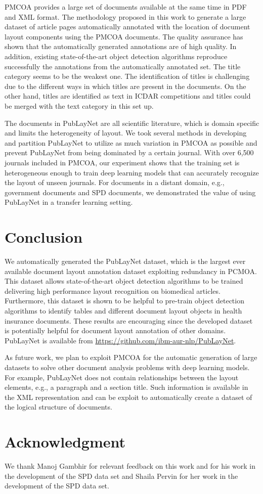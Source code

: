 \documentclass[conference]{IEEEtran}
\begin{document}
PMCOA provides a large set of documents available at the same time in PDF and XML format.
The methodology proposed in this work to generate a large dataset of article pages automatically annotated with the location of document layout components using the PMCOA documents.
The quality assurance has shown that the automatically generated annotations are of high quality.
In addition, existing state-of-the-art object detection algorithms reproduce successfully the annotations from the automatically annotated set.
The title category seems to be the weakest one.
The identification of titles is challenging due to the different ways in which titles are present in the documents.
On the other hand, titles are identified as text in ICDAR competitions and titles could be merged with the text category in this set up.

The documents in PubLayNet are all scientific literature, which is domain specific and limits the heterogeneity of layout. We took several methods in developing and partition PubLayNet to utilize as much variation in PMCOA as possible and prevent PubLayNet from being dominated by a certain journal. With over 6,500 journals included in PMCOA, our experiment shows that the training set is heterogeneous enough to train deep learning models that can accurately recognize the layout of unseen journals. For documents in a distant domain, e.g., government documents and SPD documents, we demonstrated the value of using PubLayNet in a transfer learning setting.

\section{Conclusion}

We automatically generated the PubLayNet dataset, which is the largest ever available document layout annotation dataset exploiting redundancy in PCMOA.
This dataset allows state-of-the-art object detection algorithms to be trained delivering high performance layout recognition on biomedical articles.
Furthermore, this dataset is shown to be helpful to pre-train object detection algorithms to identify tables and different document layout objects in health insurance documents.
These results are encouraging since the developed dataset is potentially helpful for document layout annotation of other domains.
PubLayNet is available from \url{https://github.com/ibm-aur-nlp/PubLayNet}.

As future work, we plan to exploit PMCOA for the automatic generation of large  datasets to solve other document analysis problems with deep learning models. For example, PubLayNet does not contain relationships between the layout elements, e.g., a paragraph and a section title. Such information is available in the XML representation and can be exploit to automatically create a dataset of the logical structure of documents.

\section*{Acknowledgment}
We thank Manoj Gambhir for relevant feedback on this work and for his work in the development of the SPD data set and Shaila Pervin for her work in the development of the SPD data set.



\end{document}

